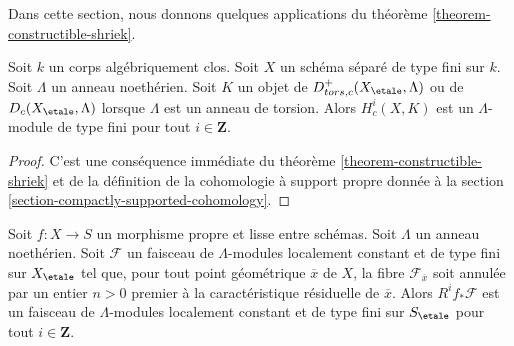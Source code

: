 \noindent
Dans cette section, nous donnons quelques applications du
théorème \ref{theorem-constructible-shriek}.

\begin{lemma}
\label{lemma-finiteness-compactly-supported}
Soit $k$ un corps algébriquement clos.
Soit $X$ un schéma séparé de type fini sur $k$.
Soit $\Lambda$ un anneau noethérien. Soit $K$ un objet de
$D^+_{tors, c}(X_\etale, \Lambda)$ ou de $D_c(X_\etale, \Lambda)$
lorsque $\Lambda$ est un anneau de torsion. Alors
$H^i_c(X, K)$ est un $\Lambda$-module de type fini pour tout
$i \in \mathbf{Z}$.
\end{lemma}

\begin{proof}
C'est une conséquence immédiate du théorème \ref{theorem-constructible-shriek}
et de la définition de la cohomologie à support propre donnée à la
section \ref{section-compactly-supported-cohomology}.
\end{proof}

\begin{proposition}
\label{proposition-loc-cst-torsion}
Soit $f : X \to S$ un morphisme propre et lisse entre schémas.
Soit $\Lambda$ un anneau noethérien. Soit $\mathcal{F}$ un
faisceau de $\Lambda$-modules localement constant et de type fini
sur $X_\etale$ tel que, pour tout point géométrique $\overline{x}$ de $X$,
la fibre $\mathcal{F}_{\overline{x}}$ soit annulée par un entier
$n > 0$ premier à la caractéristique résiduelle de $\overline{x}$.
Alors $R^if_*\mathcal{F}$ est un faisceau de
$\Lambda$-modules localement constant et de type fini sur $S_\etale$ pour tout $i \in \mathbf{Z}$.
\end{proposition}


